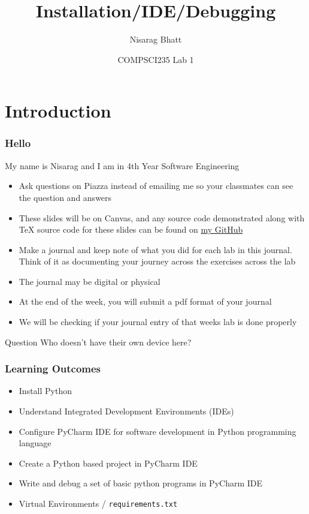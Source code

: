 \documentclass{beamer}
\title[COMPSCI 235 Lab 1 (2020)]
{Installation/IDE/Debugging}
\author{Nisarag Bhatt}
\date[July 2020] 
{COMPSCI235 Lab 1}
\begin{document}
\frame{\titlepage}
\section{Introduction}
\begin{frame}
  \frametitle{Hello}
  My name is Nisarag and I am in 4th Year Software Engineering 
  \begin{itemize}
    \item Ask questions on Piazza instead of emailing me so your classmates can see the question and answers 
    \item These slides will be on Canvas, and any source code demonstrated along with TeX source code for these slides can be found on \href{https://github.com/FocalChord}{my GitHub}
  \end{itemize}
\end{frame}
\begin{frame}
  \begin{itemize}
  	\item Make a journal and keep note of what you did for each lab in this journal. Think of it as documenting your journey across the exercises across the lab
  	\item The journal may be digital or physical
  	\item At the end of the week, you will submit a pdf format of your journal
    \item We will be checking if your journal entry of that weeks lab is done properly 
  \end{itemize}
\end{frame}
\begin{frame}
  \begin{block}{Question}
  	Who doesn't have their own device here?
  \end{block}  
\end{frame}
\begin{frame}
  \frametitle{Learning Outcomes}
  \begin{itemize}
  	\item Install Python
    \item Understand Integrated Development Environments (IDEs)
    \item Configure PyCharm IDE for software development in Python programming language
    \item Create a Python based project in PyCharm IDE
    \item Write and debug a set of basic python programs in PyCharm IDE
    \item Virtual Environments / \texttt{requirements.txt}
  \end{itemize}
\end{frame}
\end{document}
